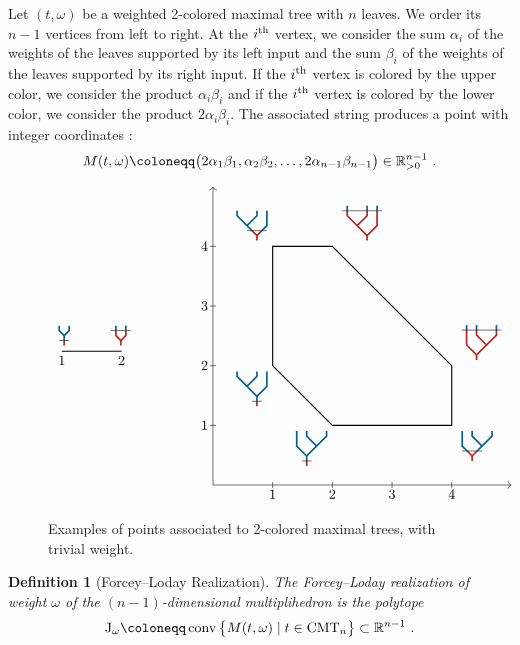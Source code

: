 \documentclass[twoside, 11pt]{amsart}
\newtheorem{definition}{Definition}[section]
\theoremstyle{remark}
\begin{document}
Let $(t, \omega)$ be a weighted 2-colored maximal tree with $n$ leaves. We order its $n-1$ vertices from left to right. At the $i^{\rm th}$ vertex, we consider the sum $\alpha_i$ of the weights of the leaves supported by its left input and 
 the sum $\beta_i$ of the weights of the leaves supported by its right input. 
If the $i^{\rm th}$ vertex is colored by the upper color, we consider the product $\alpha_i\beta_i$ and if the 
$i^{\rm th}$ vertex is colored by the lower color, we consider the product $2\alpha_i\beta_i$.
The associated string produces a point with integer coordinates :
\[M(t, \omega) \coloneqq \big(2\alpha_1\beta_1, \alpha_2\beta_2, \ldots, 2\alpha_{n-1}\beta_{n-1}\big)\in 
\RR_{>0}^{n-1}\ . \]
\begin{figure}[h!]
\[
\vcenter{\hbox{\begin{tikzpicture}[scale=1.5]
\draw[thick] (1,0)--(2,0);
\draw (1,0) node[above] {$\TreeBa$};
\draw (1.95,0) node[above] {$\TreeBb$};
\draw (1,0) node[below] {$1$};
\draw (2,0) node[below] {$2$};
\end{tikzpicture}}} \qquad \qquad
\vcenter{\hbox{
\begin{tikzpicture}[scale=1.5]
\draw (1,-0.05)--(1,0.05);
\draw (2,-0.05)--(2,0.05);
\draw (3,-0.05)--(3,0.05);
\draw (4,-0.05)--(4,0.05);
\draw (-0.05, 1)--(0.05,1);
\draw (-0.05, 2)--(0.05,2);
\draw (-0.05, 3)--(0.05,3);
\draw (-0.05, 4)--(0.05,4);
\draw[->] (0,0)--(5,0);
\draw[->] (0,0)--(0,5);
\draw (1,0) node[below] {$1$};
\draw (2,0) node[below] {$2$};
\draw (3,0) node[below] {$3$};
\draw (4,0) node[below] {$4$};
\draw (0,1) node[left] {$1$};
\draw (0,2) node[left] {$2$};
\draw (0,3) node[left] {$3$};
\draw (0,4) node[left] {$4$};
\draw[thick] (1,2)--(1,4)--(2,4)--(4,2)--(4,1)--(2,1)--cycle;
\draw (1,2) node[below left] {$\TreeLa$};
\draw (2,1) node[below left] {$\TreeRa$};
\draw (2,4) node[above right] {$\TreeLc$};
\draw (4,2) node[above right] {$\TreeRc$};
\draw (1,4) node[above left] {$\TreeLb$};
\draw (4,1) node[below right] {$\TreeRb$};
\end{tikzpicture}}}
\]
\caption{Examples of points associated to 2-colored maximal trees, with trivial weight.}
\end{figure}


\begin{definition}[Forcey--Loday Realization] \label{def:ForceyLoday}
 The \emph{Forcey--Loday realization of weight $\omega$} of the $(n-1)$-dimensional multiplihedron is the  polytope
\[\J_\omega \coloneqq \conv \big\{M(t, \omega)\mid t\in \CMT{n} \big\}\subset \RR^{n-1}\ .\]
\end{definition}
\end{document}
